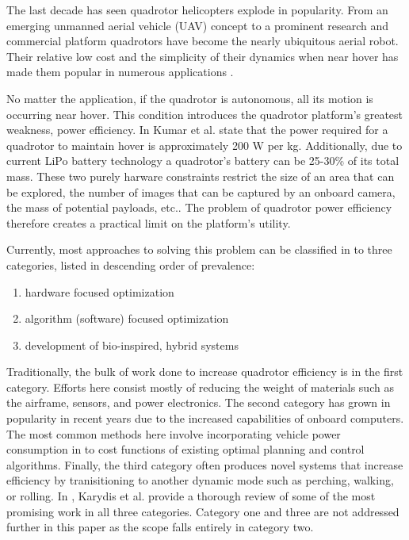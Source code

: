  
The last decade has seen quadrotor helicopters explode in popularity. From an emerging unmanned aerial vehicle (UAV) concept to a prominent research and commercial platform \cite{kumar2012opportunities,hoffmann2007quadrotor} quadrotors have become the nearly ubiquitous aerial robot. Their relative low cost and the simplicity of their dynamics when near hover \cite{bouabdallah2004pid} has made them popular in numerous applications \cite{heng2015efficient,roberts2017submodular,frazzoli2002real}. 

No matter the application, if the quadrotor is autonomous, all its motion is occurring near hover. This condition introduces the quadrotor platform's greatest weakness, power efficiency. In \cite{kumar2012opportunities} Kumar et al. state that the power required for a quadrotor to maintain hover is approximately 200 W per kg. Additionally, due to current LiPo battery technology a quadrotor's battery can be 25-30\% of its total mass. These two purely harware constraints restrict the size of an area that can be explored, the number of images that can be captured by an onboard camera, the mass of potential payloads, etc.. The problem of quadrotor power efficiency therefore creates a practical limit on the platform's utility. 

Currently, most approaches to solving this problem can be classified in to three categories, listed in descending order of prevalence: 
\begin{enumerate}
	\item hardware focused optimization
	\item algorithm (software) focused optimization
	\item development of bio-inspired, hybrid systems
\end{enumerate}
Traditionally, the bulk of work done to increase quadrotor efficiency is in the first category. Efforts here consist mostly of reducing the weight of materials such as the airframe, sensors, and power electronics. The second category has grown in popularity in recent years due to the increased capabilities of onboard computers. The most common methods here involve incorporating vehicle power consumption in to cost functions of existing optimal planning and control algorithms. Finally, the third category often produces novel systems that increase efficiency by tranisitioning to another dynamic mode such as perching, walking, or rolling. In \cite{karydis2017energetics}, Karydis et al. provide a thorough review of some of the most promising work in all three categories. Category one and three are not addressed further in this paper as the scope falls entirely in category two.

